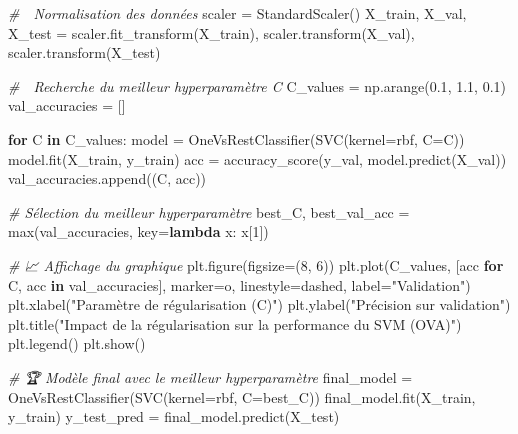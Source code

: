\documentclass[
]{article}
\newenvironment{Shaded}{}{}
\newcommand{\BuiltInTok}[1]{\textcolor[rgb]{0.00,0.50,0.00}{#1}}
\newcommand{\CommentTok}[1]{\textcolor[rgb]{0.38,0.63,0.69}{\textit{#1}}}
\newcommand{\ControlFlowTok}[1]{\textcolor[rgb]{0.00,0.44,0.13}{\textbf{#1}}}
\newcommand{\DecValTok}[1]{\textcolor[rgb]{0.25,0.63,0.44}{#1}}
\newcommand{\FloatTok}[1]{\textcolor[rgb]{0.25,0.63,0.44}{#1}}
\newcommand{\KeywordTok}[1]{\textcolor[rgb]{0.00,0.44,0.13}{\textbf{#1}}}
\newcommand{\NormalTok}[1]{#1}
\newcommand{\OperatorTok}[1]{\textcolor[rgb]{0.40,0.40,0.40}{#1}}
\newcommand{\StringTok}[1]{\textcolor[rgb]{0.25,0.44,0.63}{#1}}
\begin{document}
\begin{Shaded}
\begin{Highlighting}[]
\CommentTok{\# 🔢 Normalisation des données}
\NormalTok{scaler }\OperatorTok{=}\NormalTok{ StandardScaler()}
\NormalTok{X\_train, X\_val, X\_test }\OperatorTok{=}\NormalTok{ scaler.fit\_transform(X\_train), scaler.transform(X\_val), scaler.transform(X\_test)}

\CommentTok{\# 🎯 Recherche du meilleur hyperparamètre C}
\NormalTok{C\_values }\OperatorTok{=}\NormalTok{ np.arange(}\FloatTok{0.1}\NormalTok{, }\FloatTok{1.1}\NormalTok{, }\FloatTok{0.1}\NormalTok{)}
\NormalTok{val\_accuracies }\OperatorTok{=}\NormalTok{ []}

\ControlFlowTok{for}\NormalTok{ C }\KeywordTok{in}\NormalTok{ C\_values:}
\NormalTok{    model }\OperatorTok{=}\NormalTok{ OneVsRestClassifier(SVC(kernel}\OperatorTok{=}\StringTok{\textquotesingle{}rbf\textquotesingle{}}\NormalTok{, C}\OperatorTok{=}\NormalTok{C))}
\NormalTok{    model.fit(X\_train, y\_train)}
\NormalTok{    acc }\OperatorTok{=}\NormalTok{ accuracy\_score(y\_val, model.predict(X\_val))}
\NormalTok{    val\_accuracies.append((C, acc))}

\CommentTok{\# Sélection du meilleur hyperparamètre}
\NormalTok{best\_C, best\_val\_acc }\OperatorTok{=} \BuiltInTok{max}\NormalTok{(val\_accuracies, key}\OperatorTok{=}\KeywordTok{lambda}\NormalTok{ x: x[}\DecValTok{1}\NormalTok{])}


\CommentTok{\# 📈 Affichage du graphique}
\NormalTok{plt.figure(figsize}\OperatorTok{=}\NormalTok{(}\DecValTok{8}\NormalTok{, }\DecValTok{6}\NormalTok{))}
\NormalTok{plt.plot(C\_values, [acc }\ControlFlowTok{for}\NormalTok{ C, acc }\KeywordTok{in}\NormalTok{ val\_accuracies], marker}\OperatorTok{=}\StringTok{\textquotesingle{}o\textquotesingle{}}\NormalTok{, linestyle}\OperatorTok{=}\StringTok{\textquotesingle{}dashed\textquotesingle{}}\NormalTok{, label}\OperatorTok{=}\StringTok{"Validation"}\NormalTok{)}
\NormalTok{plt.xlabel(}\StringTok{"Paramètre de régularisation (C)"}\NormalTok{)}
\NormalTok{plt.ylabel(}\StringTok{"Précision sur validation"}\NormalTok{)}
\NormalTok{plt.title(}\StringTok{"Impact de la régularisation sur la performance du SVM (OVA)"}\NormalTok{)}
\NormalTok{plt.legend()}
\NormalTok{plt.show()}

\CommentTok{\# 🏆 Modèle final avec le meilleur hyperparamètre}
\NormalTok{final\_model }\OperatorTok{=}\NormalTok{ OneVsRestClassifier(SVC(kernel}\OperatorTok{=}\StringTok{\textquotesingle{}rbf\textquotesingle{}}\NormalTok{, C}\OperatorTok{=}\NormalTok{best\_C))}
\NormalTok{final\_model.fit(X\_train, y\_train)}
\NormalTok{y\_test\_pred }\OperatorTok{=}\NormalTok{ final\_model.predict(X\_test)}


\end{Highlighting}
\end{Shaded}
\end{document}
